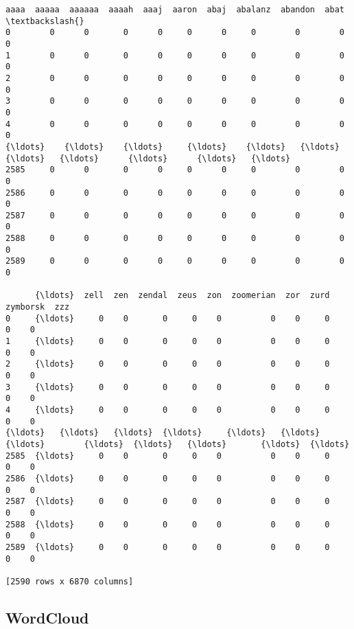 \documentclass[11pt]{article}
\makeatletter
\newcommand{\boxspacing}{\kern\kvtcb@left@rule\kern\kvtcb@boxsep}
\newcommand{\prompt}[4]{
        {\ttfamily\llap{{\color{#2}[#3]:\hspace{3pt}#4}}\vspace{-\baselineskip}}
    }
\makeatother
\begin{document}
            \begin{tcolorbox}[breakable, size=fbox, boxrule=.5pt, pad at break*=1mm, opacityfill=0]
\prompt{Out}{outcolor}{197}{\boxspacing}
\begin{Verbatim}[commandchars=\\\{\}]
      aaaa  aaaaa  aaaaaa  aaaah  aaaj  aaron  abaj  abalanz  abandon  abat  \textbackslash{}
0        0      0       0      0     0      0     0        0        0     0
1        0      0       0      0     0      0     0        0        0     0
2        0      0       0      0     0      0     0        0        0     0
3        0      0       0      0     0      0     0        0        0     0
4        0      0       0      0     0      0     0        0        0     0
{\ldots}    {\ldots}    {\ldots}     {\ldots}    {\ldots}   {\ldots}    {\ldots}   {\ldots}      {\ldots}      {\ldots}   {\ldots}
2585     0      0       0      0     0      0     0        0        0     0
2586     0      0       0      0     0      0     0        0        0     0
2587     0      0       0      0     0      0     0        0        0     0
2588     0      0       0      0     0      0     0        0        0     0
2589     0      0       0      0     0      0     0        0        0     0

      {\ldots}  zell  zen  zendal  zeus  zon  zoomerian  zor  zurd  zymborsk  zzz
0     {\ldots}     0    0       0     0    0          0    0     0         0    0
1     {\ldots}     0    0       0     0    0          0    0     0         0    0
2     {\ldots}     0    0       0     0    0          0    0     0         0    0
3     {\ldots}     0    0       0     0    0          0    0     0         0    0
4     {\ldots}     0    0       0     0    0          0    0     0         0    0
{\ldots}   {\ldots}   {\ldots}  {\ldots}     {\ldots}   {\ldots}  {\ldots}        {\ldots}  {\ldots}   {\ldots}       {\ldots}  {\ldots}
2585  {\ldots}     0    0       0     0    0          0    0     0         0    0
2586  {\ldots}     0    0       0     0    0          0    0     0         0    0
2587  {\ldots}     0    0       0     0    0          0    0     0         0    0
2588  {\ldots}     0    0       0     0    0          0    0     0         0    0
2589  {\ldots}     0    0       0     0    0          0    0     0         0    0

[2590 rows x 6870 columns]
\end{Verbatim}
\end{tcolorbox}
        
    \hypertarget{wordcloud}{%
\subsection{WordCloud}\label{wordcloud}}
\end{document}

